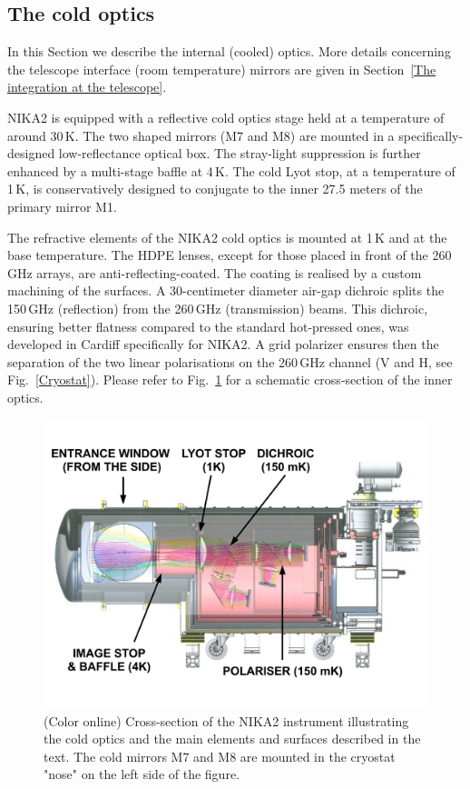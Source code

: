 \documentclass[]{aa} %
\begin{document}
 \subsection{The cold optics}

In this Section we describe the internal (cooled) optics. More details concerning the telescope interface (room temperature) mirrors are given in Section~\ref{The integration at the telescope}.

NIKA2 is equipped with a reflective cold optics stage held at a temperature of around 30\,K. The two shaped mirrors (M7 and M8) are mounted in a specifically-designed low-reflectance optical box. The stray-light suppression is further enhanced by a multi-stage baffle at 4\,K. The cold Lyot stop, at a temperature of 1\,K, is conservatively designed to conjugate to the inner 27.5 meters of the primary mirror M1.

The refractive elements of the NIKA2 cold optics is mounted at 1\,K and at the base temperature. The HDPE lenses, except for those placed in front of the 260\,GHz arrays, are anti-reflecting-coated. The coating is realised by a custom machining of the surfaces. A 30-centimeter diameter air-gap dichroic splits the 150\,GHz (reflection) from the 260\,GHz (transmission) beams. This dichroic, ensuring better flatness compared to the standard hot-pressed ones, was developed in Cardiff specifically for NIKA2. A grid polarizer ensures then the separation of the two linear polarisations on the 260\,GHz channel (V and H, see Fig.~\ref{Cryostat}). Please refer to Fig.~\ref{Cryostat_optics} for a schematic cross-section of the inner optics.

\begin{figure}[h]
   \centering
   \includegraphics[width=.95\linewidth]{NIKA2_optics.pdf}
      \caption{(Color online) Cross-section of the NIKA2 instrument illustrating the cold optics and the main elements and surfaces described in the text. The cold mirrors M7 and M8 are mounted in the cryostat "nose" on the left side of the figure.}
         \label{Cryostat_optics}
\end{figure}
\end{document}

